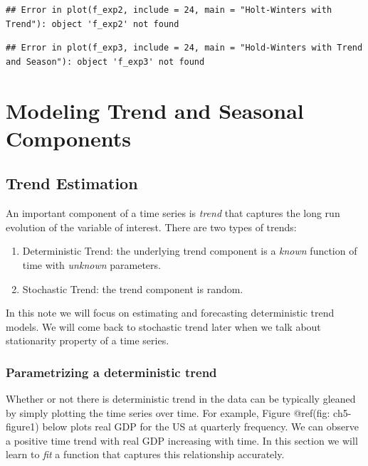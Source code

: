 \documentclass[]{book}
\theoremstyle{definition}
\theoremstyle{definition}
\theoremstyle{definition}
\theoremstyle{remark}
\begin{document}
\begin{verbatim}
## Error in plot(f_exp2, include = 24, main = "Holt-Winters with Trend"): object 'f_exp2' not found
\end{verbatim}

\begin{verbatim}
## Error in plot(f_exp3, include = 24, main = "Hold-Winters with Trend and Season"): object 'f_exp3' not found
\end{verbatim}

\hypertarget{modeling-trend-and-seasonal-components}{%
\chapter{Modeling Trend and Seasonal Components}\label{modeling-trend-and-seasonal-components}}

\hypertarget{trend-estimation}{%
\section{Trend Estimation}\label{trend-estimation}}

An important component of a time series is \emph{trend} that captures the long run evolution of the variable of interest. There are two types of trends:

\begin{enumerate}
\def\labelenumi{\arabic{enumi}.}
\item
  Deterministic Trend: the underlying trend component is a \emph{known} function of time with \emph{unknown} parameters.
\item
  Stochastic Trend: the trend component is random.
\end{enumerate}

In this note we will focus on estimating and forecasting deterministic trend models. We will come back to stochastic trend later when we talk about stationarity property of a time series.

\hypertarget{parametrizing-a-deterministic-trend}{%
\subsection{Parametrizing a deterministic trend}\label{parametrizing-a-deterministic-trend}}

Whether or not there is deterministic trend in the data can be typically gleaned by simply plotting the time series over time. For example, Figure @ref(fig: ch5-figure1) below plots real GDP for the US at quarterly frequency. We can observe a positive time trend with real GDP increasing with time. In this section we will learn to \emph{fit} a function that captures this relationship accurately.
\end{document}
